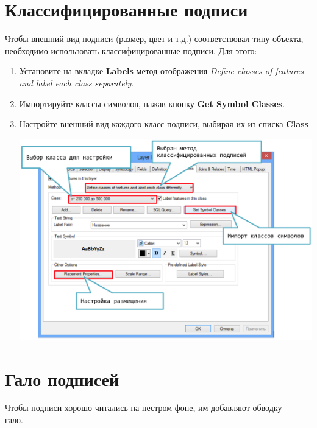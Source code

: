 \documentclass[]{book}
\theoremstyle{definition}
\theoremstyle{definition}
\theoremstyle{definition}
\theoremstyle{remark}
\begin{document}
\hypertarget{-}{%
\section{Классифицированные подписи}\label{-}}

Чтобы внешний вид подписи (размер, цвет и т.д.) соответствовал типу
объекта, необходимо использовать классифицированные подписи. Для этого:

\begin{enumerate}
\def\labelenumi{\arabic{enumi}.}
\item
  Установите на вкладке \textbf{Labels} метод отображения \emph{Define
  classes of features and label each class separately}.
\item
  Импортируйте классы символов, нажав кнопку \textbf{Get Symbol
  Classes}.
\item
  Настройте внешний вид каждого класс подписи, выбирая их из списка
  \textbf{Class}

  \includegraphics{images/Appendix/image41.png}
\end{enumerate}

\hypertarget{-}{%
\section{Гало подписей}\label{-}}

Чтобы подписи хорошо читались на пестром фоне, им добавляют обводку ---
гало.
\end{document}

